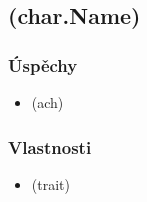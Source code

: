 \documentclass[a4paper,12pt]{article}
\begin{document}
        \subsection{(char.Name)}

            \subsubsection{Úspěchy}
                \begin{itemize}
                    \renewcommand\labelitemi{--}
                    \item (ach)
                \end{itemize}

            \subsubsection{Vlastnosti}
                \begin{itemize}
                    \renewcommand\labelitemi{--}
                    \item (trait)
                \end{itemize}

\end{document}
